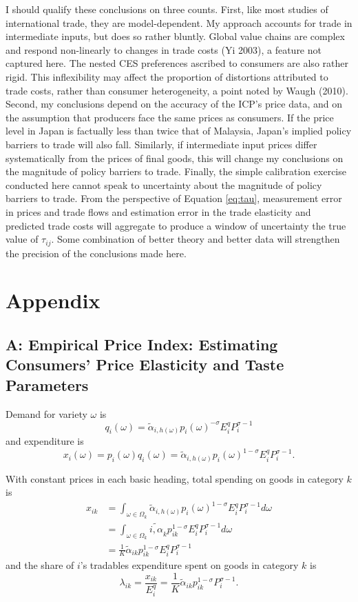 \documentclass{puthesis}
\begin{document}
I should qualify these conclusions on three counts. First, like most
studies of international trade, they are model-dependent. My approach
accounts for trade in intermediate inputs, but does so rather bluntly.
Global value chains are complex and respond non-linearly to changes in
trade costs (Yi 2003), a feature not captured here. The nested CES
preferences ascribed to consumers are also rather rigid. This
inflexibility may affect the proportion of distortions attributed to
trade costs, rather than consumer heterogeneity, a point noted by Waugh
(2010). Second, my conclusions depend on the accuracy of the ICP's price
data, and on the assumption that producers face the same prices as
consumers. If the price level in Japan is factually less than twice that
of Malaysia, Japan's implied policy barriers to trade will also fall.
Similarly, if intermediate input prices differ systematically from the
prices of final goods, this will change my conclusions on the magnitude
of policy barriers to trade. Finally, the simple calibration exercise
conducted here cannot speak to uncertainty about the magnitude of policy
barriers to trade. From the perspective of Equation \ref{eq:tau},
measurement error in prices and trade flows and estimation error in the
trade elasticity and predicted trade costs will aggregate to produce a
window of uncertainty the true value of \(\tau_{ij}\). Some combination
of better theory and better data will strengthen the precision of the
conclusions made here.

\clearpage

\section{Appendix}

\subsection{A: Empirical Price Index: Estimating Consumers' Price
Elasticity and Taste Parameters}

Demand for variety \(\omega\) is \[
q_i(\omega) = \tilde{\alpha}_{i, h(\omega)} p_i(\omega)^{-\sigma} E_i^q P_i^{\sigma - 1}
\] and expenditure is \[
x_i(\omega) = p_i(\omega) q_i(\omega) = \tilde{\alpha}_{i, h(\omega)} p_i(\omega)^{1-\sigma} E_i^q P_i^{\sigma - 1} . 
\]

With constant prices in each basic heading, total spending on goods in
category \(k\) is \begin{align*}
x_{ik} &= \int_{\omega \in \Omega_k} \tilde{\alpha}_{i, h(\omega)} p_i(\omega)^{1-\sigma} E_i^q P_i^{\sigma - 1} d \omega \\
&= \int_{\omega \in \Omega_k} \tilde{i, \alpha}_k p_{ik}^{1 - \sigma} E_i^q P_i^{\sigma - 1} d \omega \\
&= \frac{1}{K} \tilde{\alpha}_{ik} p_{ik}^{1 - \sigma} E_i^q P_i^{\sigma - 1}
\end{align*} and the share of \(i\)'s tradables expenditure spent on
goods in category \(k\) is \[
\lambda_{ik} = \frac{x_{ik}}{E_i^q} = \frac{1}{K} \tilde{\alpha}_{ik} p_{ik}^{1 - \sigma} P_i^{\sigma - 1} .
\]
\end{document}
